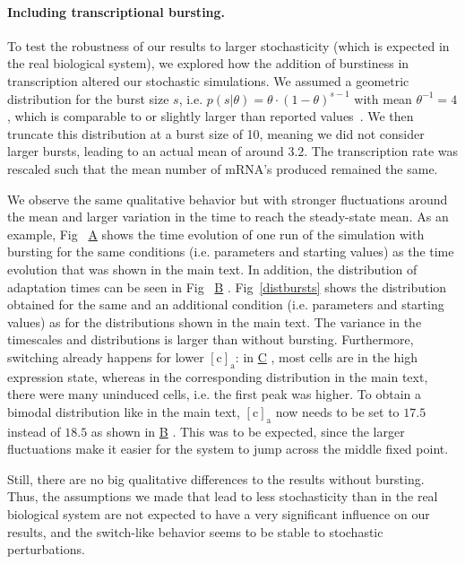 \documentclass[10pt,letterpaper]{article}
\newcommand\subref[2]{%
	\def\myref{\getrefnumber{#1}}%
	\hyperref[#1]{\myref\mbox{#2}}%
}
\begin{document}
\paragraph*{Including transcriptional bursting.} To test the robustness of our results to larger stochasticity (which is expected in the real biological system), we explored how the addition of burstiness in transcription altered our stochastic simulations. We assumed a geometric distribution for the burst size $s$, i.e. $p(s|\theta) = \theta\cdot (1-\theta)^{s-1}$ with mean $\theta^{-1}=4$, which is comparable to or slightly larger than reported values~\cite{Golding2005}. We then truncate this distribution at a burst size of 10, meaning we did not consider larger bursts, leading to an actual mean of around $3.2$. The transcription rate was rescaled such that the mean number of mRNA's produced remained the same. 

We observe the same qualitative behavior but with stronger fluctuations around the mean and larger variation in the time to reach the steady-state mean. As an example, Fig~\subref{evolbursts}{A} shows the time evolution of one run of the simulation with bursting for the same conditions (i.e. parameters and starting values) as the time evolution that was shown in the main text. In addition, the distribution of adaptation times can be seen in Fig~\subref{evolbursts}{B}. Fig~\ref{distbursts} shows the distribution obtained for the same and an additional condition (i.e. parameters and starting values) as for the distributions shown in the main text. The variance in the timescales and distributions is larger than without bursting. Furthermore, switching already happens for lower $\mathrm{[c]_a}$: in \subref{distbursts}{C}, most cells are in the high expression state, whereas in the corresponding distribution in the main text, there were many uninduced cells, i.e. the first peak was higher. To obtain a bimodal distribution like in the main text, $\mathrm{[c]_a}$ now needs to be set to $17.5$ instead of $18.5$ as shown in \subref{distbursts}{B}. This was to be expected, since the larger fluctuations make it easier for the system to jump across the middle fixed point.

Still, there are no big qualitative differences to the results without bursting. Thus, the assumptions we made that lead to less stochasticity than in the real biological system are not expected to have a very significant influence on our results, and the switch-like behavior seems to be stable to stochastic perturbations. 
\end{document}
